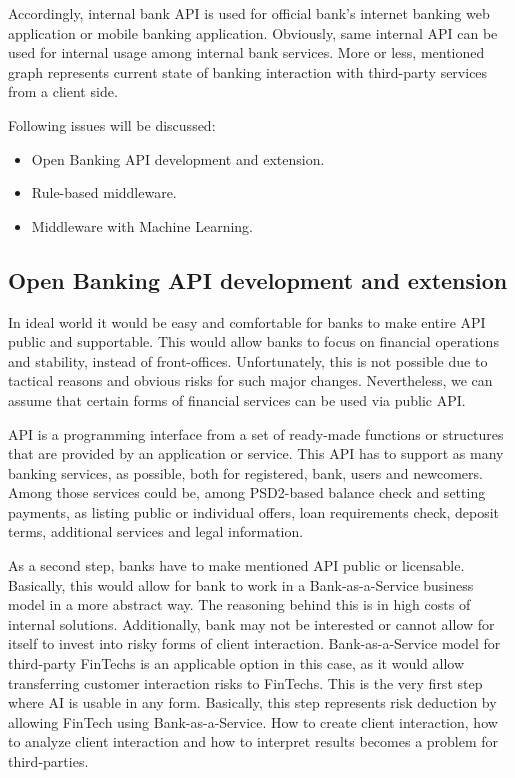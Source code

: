 Accordingly, internal bank API is used for official bank's internet banking web application or mobile banking application. 
Obviously, same internal API can be used for internal usage among internal bank services.
More or less, mentioned graph represents current state of banking interaction with third-party services from a client side.

\bigskip
\noindent Following issues will be discussed: 
\begin{itemize}
    \item Open Banking API development and extension.
    \item Rule-based middleware.
    \item Middleware with Machine Learning.
\end{itemize}

\subsection*{Open Banking API development and extension}

In ideal world it would be easy and comfortable for banks to make entire API public and supportable.
This would allow banks to focus on financial operations and stability, instead of front-offices.
Unfortunately, this is not possible due to tactical reasons and obvious risks for such major changes.
Nevertheless, we can assume that certain forms of financial services can be used via public API.

API is a programming interface from a set of ready-made functions or structures that are provided by an application or service.
This API has to support as many banking services, as possible, both for registered, bank, users and newcomers. 
Among those services could be, among PSD2-based balance check and setting payments, as listing public or individual offers, loan requirements check, deposit terms, additional services and legal information.

As a second step, banks have to make mentioned API public or licensable.
Basically, this would allow for bank to work in a Bank-as-a-Service business model in a more abstract way.
The reasoning behind this is in high costs of internal solutions. 
Additionally, bank may not be interested or cannot allow for itself to invest into risky forms of client interaction.
Bank-as-a-Service model for third-party FinTechs is an applicable option in this case, as it would allow transferring customer interaction risks to FinTechs.
This is the very first step where AI is usable in any form.
Basically, this step represents risk deduction by allowing FinTech using Bank-as-a-Service.
How to create client interaction, how to analyze client interaction and how to interpret results becomes a problem for third-parties.

